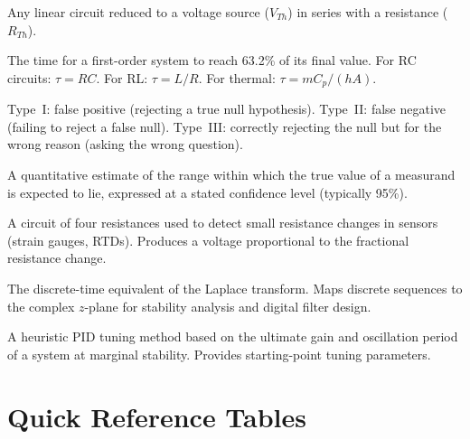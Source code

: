 \documentclass[11pt,letterpaper,twoside,openany]{book}
\begin{document}
\begin{description}[style=nextline,leftmargin=3em,font=\sffamily\bfseries]
\item[Thevenin Equivalent] Any linear circuit reduced to a voltage source ($V_{Th}$) in series with a resistance ($R_{Th}$).
\item[Time Constant ($\tau$)] The time for a first-order system to reach 63.2\% of its final value. For RC circuits: $\tau = RC$. For RL: $\tau = L/R$. For thermal: $\tau = mC_p/(hA)$.
\item[Type I/II/III Error] Type~I: false positive (rejecting a true null hypothesis). Type~II: false negative (failing to reject a false null). Type~III: correctly rejecting the null but for the wrong reason (asking the wrong question).
\item[Uncertainty] A quantitative estimate of the range within which the true value of a measurand is expected to lie, expressed at a stated confidence level (typically 95\%).
\item[Wheatstone Bridge] A circuit of four resistances used to detect small resistance changes in sensors (strain gauges, RTDs). Produces a voltage proportional to the fractional resistance change.
\item[Z-Transform] The discrete-time equivalent of the Laplace transform. Maps discrete sequences to the complex $z$-plane for stability analysis and digital filter design.
\item[Ziegler-Nichols (Z-N)] A heuristic PID tuning method based on the ultimate gain and oscillation period of a system at marginal stability. Provides starting-point tuning parameters.
\end{description}


\chapter*{Quick Reference Tables}
\end{document}
